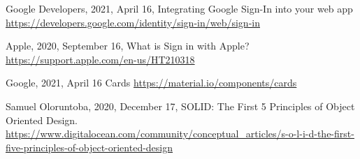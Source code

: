 \begin{thebibliography}{9} 
    Google Developers,
    2021, April 16,
    Integrating Google Sign-In into your web app
    \url{https://developers.google.com/identity/sign-in/web/sign-in}

    Apple,
    2020, September 16,
    What is Sign in with Apple?
    \url{https://support.apple.com/en-us/HT210318}

    Google,
    2021, April 16 
    Cards
    \url{https://material.io/components/cards}

    Samuel Oloruntoba,
    2020, December 17,
    SOLID: The First 5 Principles of Object Oriented Design.
    \url{https://www.digitalocean.com/community/conceptual_articles/s-o-l-i-d-the-first-five-principles-of-object-oriented-design}
\end{thebibliography}
